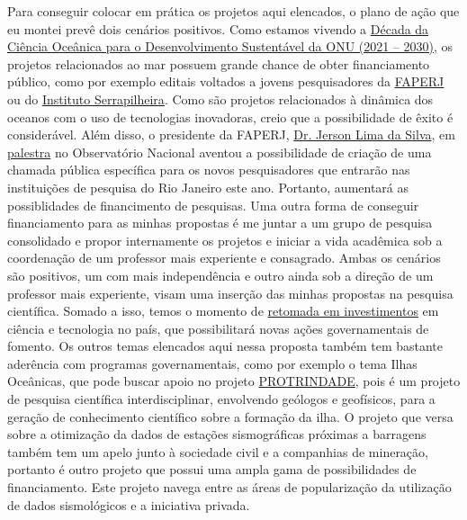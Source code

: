 \documentclass[10pt,a4paper,oneside]{book}
\begin{document}
Para conseguir colocar em prática os projetos aqui elencados, o plano de ação que eu montei prevê dois cenários positivos. Como estamos vivendo a \href{https://oceandecade.org/pt/}{Década da Ciência Oceânica para o Desenvolvimento Sustentável da ONU (2021 – 2030)}, os projetos relacionados ao mar possuem grande chance de obter financiamento público, como por exemplo editais voltados a jovens pesquisadores da \href{https://www.faperj.br/}{FAPERJ} ou do \href{https://serrapilheira.org/}{Instituto Serrapilheira}. Como são projetos relacionados à dinâmica dos oceanos com o uso de tecnologias inovadoras, creio que a possibilidade de êxito é considerável. Além disso, o presidente da FAPERJ, \href{http://lattes.cnpq.br/3010441499735789}{Dr. Jerson Lima da Silva}, em \href{https://www.gov.br/observatorio/pt-br/assuntos/noticias/presidente-da-faperj-ministrara-aula-inaugural-do-1o-semestre-letivo-de-2024-dos-programas-de-pos-graduacao-do-on}{palestra} no Observatório Nacional aventou a possibilidade de criação de uma chamada pública específica para os novos pesquisadores que entrarão nas instituições de pesquisa do Rio Janeiro este ano. Portanto, aumentará as possiblidades de financimento de pesquisas. Uma outra forma de conseguir financiamento para as minhas propostas é me juntar a um grupo de pesquisa consolidado e propor internamente os projetos e iniciar a vida acadêmica sob a coordenação de um professor mais experiente e consagrado. Ambas os cenários são positivos, um com mais independência e outro ainda sob a direção de um professor mais experiente, visam uma inserção das minhas propostas na pesquisa científica. Somado a isso, temos o momento de \href{https://www.gov.br/mcti/pt-br/acompanhe-o-mcti/noticias/2023/12/mcti-executa-100-do-orcamento-do-fundo-nacional-de-desenvolvimento-cientifico-e-tecnologico-em-2023}{retomada em investimentos} em ciência e tecnologia no país, que possibilitará novas ações governamentais de fomento. Os outros temas elencados aqui nessa proposta também tem bastante aderência com programas governamentais, como por exemplo o tema Ilhas Oceânicas, que pode buscar apoio no projeto \href{https://adesgce.org/2022/03/17/marinha-do-brasil-e-programa-de-pesquisas-na-ilha-da-trindade-protrindade/}{PROTRINDADE}, pois é um projeto de pesquisa científica interdisciplinar, envolvendo geólogos e geofísicos, para a geração de conhecimento científico sobre a formação da ilha. O projeto que versa sobre a otimização da dados de estações sismográficas próximas a barragens também tem um apelo junto à sociedade civil e a companhias de mineração, portanto é outro projeto que possui uma ampla gama de possibilidades de financiamento. Este projeto navega entre as áreas de popularização da utilização de dados sismológicos e a iniciativa privada. 
\end{document}
